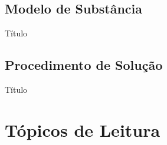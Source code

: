 \subsection{Modelo de Substância}

    \begin{frame}{Título}\vspace*{-2em}
    \end{frame}

\subsection{Procedimento de Solução}

    \begin{frame}{Título}\vspace*{-2em}
    \end{frame}

\section{Tópicos de Leitura}

